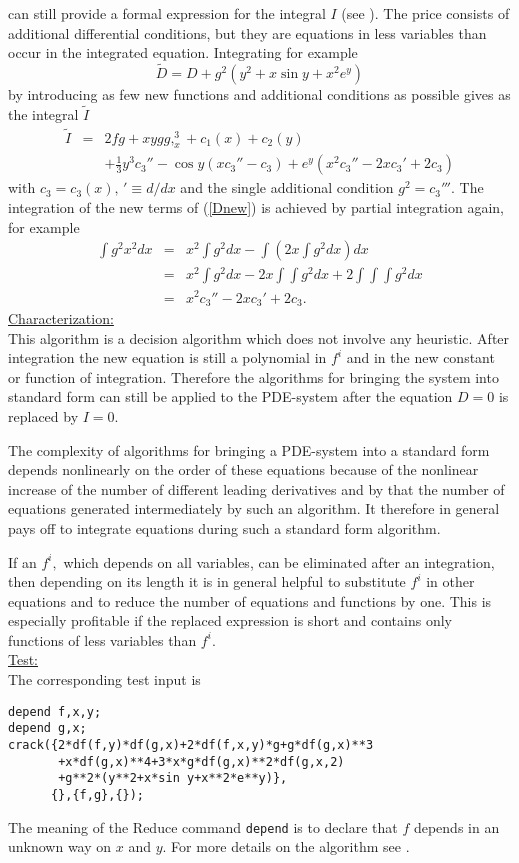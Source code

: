 \documentclass[12pt]{article}
\begin{document}
can still provide a formal expression for the integral $I$
(see \cite{WoInt}). The price consists of
additional differential conditions, but they are equations in less variables
than occur in the integrated equation. Integrating for example 
\begin{equation}
\tilde{D} = D + g^2(y^2 + x\sin y + x^2e^y)       \label{Dnew}
\end{equation}
by introducing as few 
new functions and additional conditions as possible gives as the integral 
$\tilde{I}$
\begin{eqnarray*}
\tilde{I} & = & 2fg + xygg,_{x}^{3} + c_1(x) + c_2(y) \\
  &   & + \frac{1}{3}y^3c_3'' - \cos y(xc_3'' - c_3)
+ e^y(x^2c_3'' - 2xc_3' + 2c_3)          
\end{eqnarray*}
with $c_3 = c_3(x), \, '\equiv d/dx$ and the single additional 
condition $g^2 = c_3'''.$
The integration of the new terms of (\ref{Dnew}) is
achieved by partial integration again, for example
\begin{eqnarray*}
\int g^2x^2 dx & = & x^2\int g^2 dx - \int (2x\!\int g^2 dx) dx \\
& = & x^2\int g^2 dx - 2x\int\!\!\int g^2 dx 
+ 2 \int\!\!\int\!\!\int g^2 dx \\
& = & x^2c_3'' - 2xc_3' + 2c_3.
\end{eqnarray*}
\underline{Characterization:} \\
This algorithm is a decision algorithm which does not involve any
heuristic. 
After integration the new equation is still a polynomial
in $f^i$ and in the new constant or function of integration.
Therefore the algorithms for bringing the system into standard form can still 
be applied to the PDE-system 
after the equation $D = 0$ is replaced by $I = 0.$

The complexity of algorithms for bringing a PDE-system into a standard
form depends nonlinearly on the order of these equations because of
the nonlinear increase of the number of different leading derivatives
and by that the number of equations generated intermediately by such
an algorithm. It therefore in general pays off to integrate equations 
during such a standard form algorithm.  

If an $f^i,$ which depends on all variables, can be eliminated after an 
integration, then depending on its length 
it is in general helpful to substitute $f^i$ in other equations and
to reduce the number of equations and functions by one. This is especially
profitable if the replaced expression is short and 
contains only functions of less variables than $f^i.$ \\
\underline{Test:} \\
The corresponding test input is
\begin{verbatim}
depend f,x,y;
depend g,x;
crack({2*df(f,y)*df(g,x)+2*df(f,x,y)*g+g*df(g,x)**3
       +x*df(g,x)**4+3*x*g*df(g,x)**2*df(g,x,2)
       +g**2*(y**2+x*sin y+x**2*e**y)},
      {},{f,g},{});
\end{verbatim}
The meaning of the {\sc Reduce} command {\tt depend} is to declare that $f$
depends in an unknown way on $x$ and $y$. For more details on the
algorithm see \cite{WoInt}.
\end{document}
